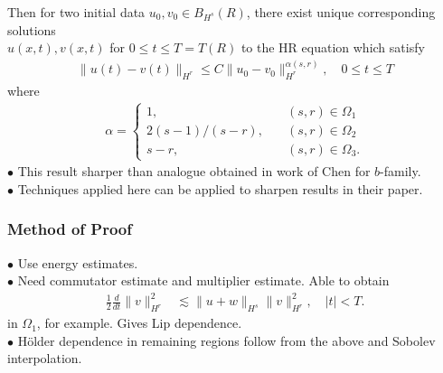 \documentclass{beamer}
\begin{document}
\begin{frame}
%
Then for two initial data $u_{0}, v_{0} \in B_{H^{s}}(R)$, there exist unique
corresponding solutions \\ $u(x,t), v(x,t)$ for $0 \le t \le T= T(R)$ to the
HR equation which satisfy 
%
%
\begin{equation*}
\begin{split}
\| u(t) - v(t) \|_{H^{r}} \le C \| u_{0} - v_{0} \|_{H^{r}}^{\alpha(s, r)},
\quad 0
\le t \le T
\end{split}
\end{equation*}
%
%
where 
%
%
\begin{equation*}
\begin{split}
\alpha = 
\begin{cases}
1, \quad & (s,r) \in \Omega_{1} 
\\
2(s-1)/(s-r),  \quad & (s, r) \in \Omega_{2}
\\
s-r, \quad & (s, r) \in \Omega_{3}.
\end{cases}
\end{split}
\end{equation*}
%
%
%
%
%
%
%
%
\pause
$\bullet$ This result sharper than analogue obtained in
work of Chen for $b$-family. 
\\
$\bullet$ Techniques applied here can be applied to sharpen results in their paper. 
\end{frame}
\begin{frame}
  \frametitle{Method of Proof}
 $\bullet$ Use energy estimates. 
 \\
 $\bullet$
 Need commutator estimate and multiplier estimate. Able to obtain
\begin{equation*}
\begin{split}
\frac{1}{2} \frac{d}{dt}
\|v\|_{H^r}^2
& \lesssim \|u+w\|_{H^s}
\|v\|_{H^r}^2, \quad | t | < T.
\label{9v-iu}
\end{split}
\end{equation*}
in $\Omega_{1}$, for example. Gives Lip dependence.
\\
\pause
$\bullet$
H\"older dependence in remaining regions follow from the above and Sobolev interpolation.
\end{frame}
\end{document}
